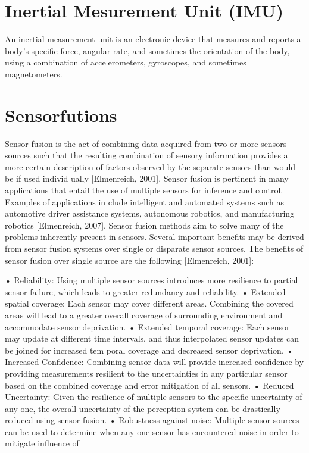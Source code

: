 \section{Inertial Mesurement Unit (IMU)}
An inertial measurement unit is an electronic device that measures and reports a body's specific force, angular rate, and sometimes the orientation of the body, using a combination of accelerometers, gyroscopes, and sometimes magnetometers.

\section{Sensorfutions}
Sensor fusion is the act of combining data acquired from two or more sensors sources
such that the resulting combination of sensory information provides a more certain description of factors observed by the separate sensors than would be if used individ
ually [Elmenreich, 2001]. Sensor fusion is pertinent in many applications that entail
the use of multiple sensors for inference and control. Examples of applications in
clude intelligent and automated systems such as automotive driver assistance systems,
autonomous robotics, and manufacturing robotics [Elmenreich, 2007].
Sensor fusion methods aim to solve many of the problems inherently present in
sensors. Several important beneﬁts may be derived from sensor fusion systems over
single or disparate sensor sources. The beneﬁts of sensor fusion over single source are
the following [Elmenreich, 2001]:

• Reliability: Using multiple sensor sources introduces more resilience to partial sensor failure, which leads to greater redundancy and reliability.
• Extended spatial coverage: Each sensor may cover diﬀerent areas. Combining the covered areas will lead to a greater overall coverage of surrounding
environment and accommodate sensor deprivation.
• Extended temporal coverage: Each sensor may update at diﬀerent time intervals, and thus interpolated sensor updates can be joined for increased tem
poral coverage and decreased sensor deprivation.
• Increased Conﬁdence: Combining sensor data will provide increased conﬁdence by providing measurements resilient to the uncertainties in any particular
sensor based on the combined coverage and error mitigation of all sensors.
• Reduced Uncertainty: Given the resilience of multiple sensors to the speciﬁc uncertainty of any one, the overall uncertainty of the perception system can be
drastically reduced using sensor fusion.
• Robustness against noise: Multiple sensor sources can be used to determine when any one sensor has encountered noise in order to mitigate inﬂuence of

